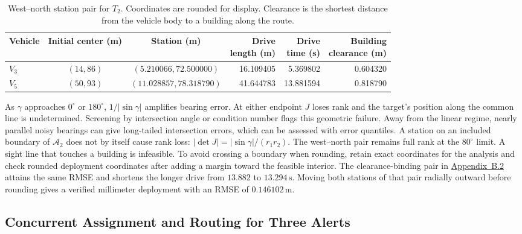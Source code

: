 \documentclass{swmcmthesis}
\begin{document}
\begin{table}[!htbp]
    \centering
    \caption{West--north station pair for \(T_2\). Coordinates are rounded for display. Clearance is the shortest distance from the vehicle body to a building along the route.}
    \label{tab:q21-west-north}
    \setlength{\tabcolsep}{4pt}
    \begin{tabular}{@{}lccrrr@{}}
        \toprule
        Vehicle & Initial center (m) & Station (m) & \shortstack[r]{Drive\\length (m)}
            & \shortstack[r]{Drive\\time (s)} & \shortstack[r]{Building\\clearance (m)} \\
        \midrule
        \(V_3\) & \((14,86)\) & \((5.210066,72.500000)\) & 16.109405 & 5.369802 & 0.604320 \\
        \(V_5\) & \((50,93)\) & \((11.028857,78.318790)\) & 41.644783 & 13.881594 & 0.818790 \\
        \bottomrule
    \end{tabular}
\end{table}

As \(\gamma\) approaches \(0^\circ\) or \(180^\circ\), \(1/|\sin\gamma|\) amplifies bearing error. At either endpoint \(J\) loses rank and the target's position along the common line is undetermined. Screening by intersection angle or condition number flags this geometric failure. Away from the linear regime, nearly parallel noisy bearings can give long-tailed intersection errors, which can be assessed with error quantiles. A station on an included boundary of \(\mathcal A_2\) does not by itself cause rank loss: \(|\det J|=|\sin\gamma|/(r_1r_2)\). The west--north pair remains full rank at the \(80^\circ\) limit. A sight line that touches a building is infeasible. To avoid crossing a boundary when rounding, retain exact coordinates for the analysis and check rounded deployment coordinates after adding a margin toward the feasible interior. The clearance-binding pair in \hyperref[app:q21-alternatives]{Appendix~B.2} attains the same RMSE and shortens the longer drive from \(13.882\) to \(13.294\,\mathrm s\). Moving both stations of that pair radially outward before rounding gives a verified millimeter deployment with an RMSE of \(0.146102\,\mathrm m\).

\subsection{Concurrent Assignment and Routing for Three Alerts}
\label{sec:q22-model}
\end{document}
